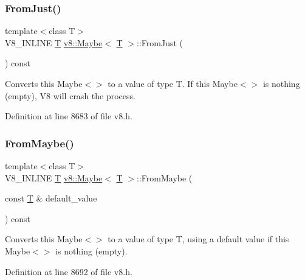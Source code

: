 \subsubsection{\texorpdfstring{From\+Just()}{FromJust()}}
{\footnotesize\ttfamily template$<$class T$>$ \\
V8\+\_\+\+I\+N\+L\+I\+NE \mbox{\hyperlink{classv8_1_1internal_1_1torque_1_1T}{T}} \mbox{\hyperlink{classv8_1_1Maybe}{v8\+::\+Maybe}}$<$ \mbox{\hyperlink{classv8_1_1internal_1_1torque_1_1T}{T}} $>$\+::From\+Just (\begin{DoxyParamCaption}{ }\end{DoxyParamCaption}) const\hspace{0.3cm}{\ttfamily [inline]}}

Converts this Maybe$<$$>$ to a value of type T. If this Maybe$<$$>$ is nothing (empty), V8 will crash the process. 

Definition at line 8683 of file v8.\+h.

\mbox{\label{classv8_1_1Maybe_a4b95361b73d9af3dddd975accca89a5f}} 
\subsubsection{\texorpdfstring{From\+Maybe()}{FromMaybe()}}
{\footnotesize\ttfamily template$<$class T$>$ \\
V8\+\_\+\+I\+N\+L\+I\+NE \mbox{\hyperlink{classv8_1_1internal_1_1torque_1_1T}{T}} \mbox{\hyperlink{classv8_1_1Maybe}{v8\+::\+Maybe}}$<$ \mbox{\hyperlink{classv8_1_1internal_1_1torque_1_1T}{T}} $>$\+::From\+Maybe (\begin{DoxyParamCaption}\item[{const \mbox{\hyperlink{classv8_1_1internal_1_1torque_1_1T}{T}} \&}]{default\+\_\+value }\end{DoxyParamCaption}) const\hspace{0.3cm}{\ttfamily [inline]}}

Converts this Maybe$<$$>$ to a value of type T, using a default value if this Maybe$<$$>$ is nothing (empty). 

Definition at line 8692 of file v8.\+h.

\mbox{\label{classv8_1_1Maybe_a7d1d77e5fd55f125fb4c41db1335bd09}} 
